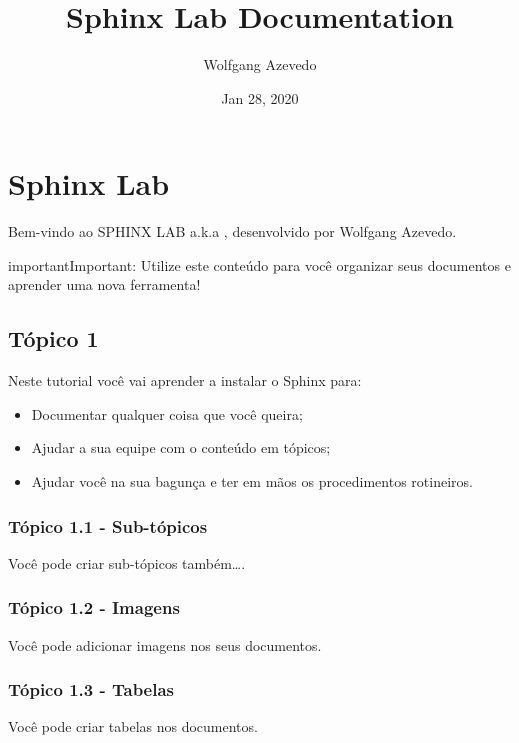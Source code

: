 \documentclass[letterpaper,10pt,english]{sphinxmanual}
\title{Sphinx Lab Documentation}
\date{Jan 28, 2020}
\author{Wolfgang Azevedo}
\begin{document}
\pagestyle{empty}
\sphinxmaketitle
\pagestyle{plain}
\sphinxtableofcontents
\pagestyle{normal}
\label{\detokenize{index::doc}}



\chapter{Sphinx Lab}
\label{\detokenize{lab/sphinx_lab:sphinx-lab}}\label{\detokenize{lab/sphinx_lab::doc}}
Bem-vindo ao SPHINX LAB a.k.a , desenvolvido por Wolfgang Azevedo.

\begin{sphinxadmonition}{important}{Important:}
Utilize este conteúdo para você organizar seus documentos e aprender uma nova ferramenta!
\end{sphinxadmonition}


\section{Tópico 1}
\label{\detokenize{lab/sphinx_lab:topico-1}}
Neste tutorial você vai aprender a instalar o Sphinx para:
\begin{itemize}
\item {} 
Documentar qualquer coisa que você queira;

\item {} 
Ajudar a sua equipe com o conteúdo  em tópicos;

\item {} 
Ajudar você na sua bagunça e ter em mãos os procedimentos rotineiros.

\end{itemize}


\subsection{Tópico 1.1 - Sub-tópicos}
\label{\detokenize{lab/sphinx_lab:topico-1-1-sub-topicos}}
Você pode criar sub-tópicos também….


\subsection{Tópico 1.2 - Imagens}
\label{\detokenize{lab/sphinx_lab:topico-1-2-imagens}}
Você pode adicionar imagens nos seus documentos.

\noindent{}


\subsection{Tópico 1.3 - Tabelas}
\label{\detokenize{lab/sphinx_lab:topico-1-3-tabelas}}
Você pode criar tabelas nos documentos.
\end{document}
